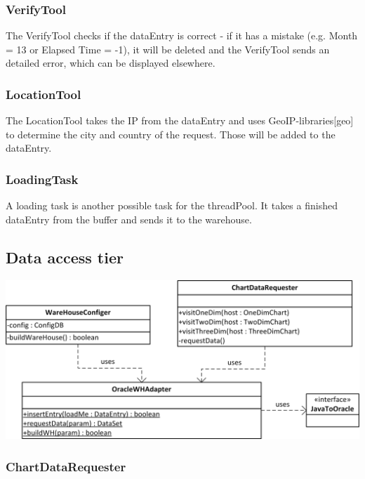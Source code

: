 \subsubsection*{VerifyTool}
The VerifyTool checks if the dataEntry is correct - if it has a mistake (e.g. Month = 13 or Elapsed Time = -1), it will 
be deleted and the VerifyTool sends an detailed error, which can be displayed elsewhere.

\subsubsection*{LocationTool}
The LocationTool takes the IP from the dataEntry and uses GeoIP-libraries[geo] to determine the city and country of the request.
Those will be added to the dataEntry.


\subsubsection*{LoadingTask}

A loading task is another possible task for the threadPool. It takes a finished dataEntry from the buffer and sends it to the warehouse.




\subsection{Data access tier}

\begin{center}
\includegraphics{Pictures/Parts/Data.png}
\end{center} 

\subsubsection*{ChartDataRequester}

